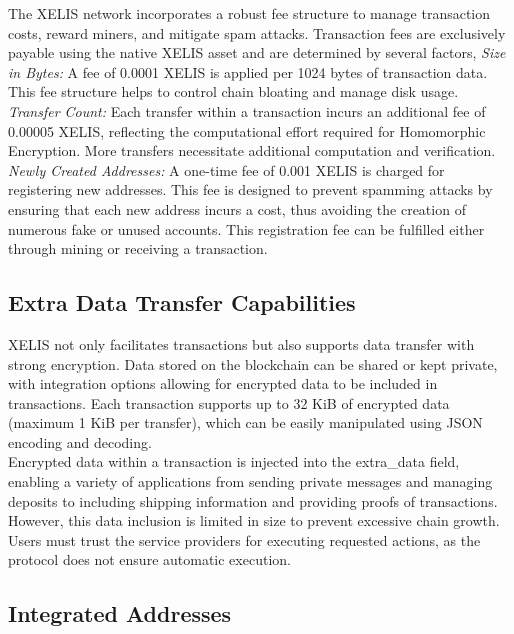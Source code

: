 \documentclass[12pt,a4paper,twocolumn]{article}
\begin{document}
The XELIS network incorporates a robust fee structure to manage transaction costs, reward miners, and mitigate spam attacks. Transaction fees are exclusively payable using the native XELIS asset and are determined by several factors, \textit{Size in Bytes:} A fee of 0.0001 XELIS is applied per 1024 bytes of transaction data. This fee structure helps to control chain bloating and manage disk usage.
\textit{Transfer Count: }Each transfer within a transaction incurs an additional fee of 0.00005 XELIS, reflecting the computational effort required for Homomorphic Encryption. More transfers necessitate additional computation and verification. \textit{Newly Created Addresses:} A one-time fee of 0.001 XELIS is charged for registering new addresses. This fee is designed to prevent spamming attacks by ensuring that each new address incurs a cost, thus avoiding the creation of numerous fake or unused accounts. This registration fee can be fulfilled either through mining or receiving a transaction.\\

\subsection{Extra Data Transfer Capabilities}

XELIS not only facilitates transactions but also supports data transfer with strong encryption. Data stored on the blockchain can be shared or kept private, with integration options allowing for encrypted data to be included in transactions. Each transaction supports up to 32 KiB of encrypted data (maximum 1 KiB per transfer), which can be easily manipulated using JSON encoding and decoding.\\

Encrypted data within a transaction is injected into the extra\_data field, enabling a variety of applications from sending private messages and managing deposits to including shipping information and providing proofs of transactions. However, this data inclusion is limited in size to prevent excessive chain growth. Users must trust the service providers for executing requested actions, as the protocol does not ensure automatic execution.\\

\subsection{Integrated Addresses}
\end{document}
